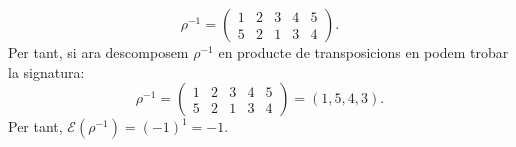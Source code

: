 \documentclass[11pt]{article}
\begin{document}
\begin{legal}
\begin{legal}
		$$\rho^{-1}=\begin{pmatrix}
		1 & 2 & 3 & 4 & 5\\
		5 & 2 & 1 & 3 & 4
		\end{pmatrix}.
		$$
		Per tant, si ara descomposem $\rho^{-1}$ en producte de transposicions en podem trobar la signatura:
		$$
		\rho^{-1}=\begin{pmatrix}
		1 & 2 & 3 & 4 & 5\\
		5 & 2 & 1 & 3 & 4
		\end{pmatrix}
		=(1,5,4,3).
		$$
		Per tant, $\mathcal{E}(\rho^{-1})=(-1)^1=-1$.
	\end{legal}
\end{legal}
\end{document}
